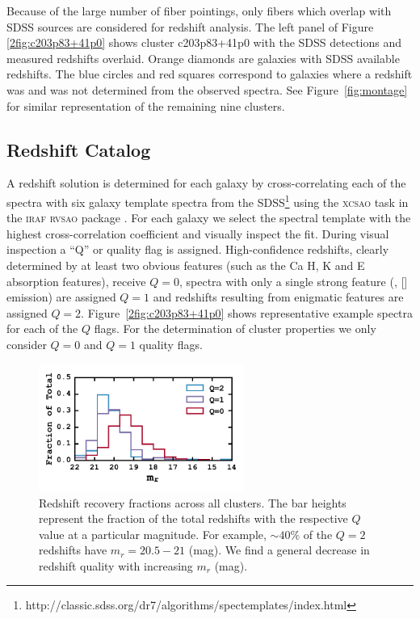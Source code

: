 Because of the large number of fiber pointings, only fibers which overlap with SDSS sources are considered for redshift analysis. The left panel of Figure \ref{2fig:c203p83+41p0} shows cluster c203p83+41p0 with the SDSS detections and measured redshifts overlaid. Orange diamonds are galaxies with SDSS available redshifts. The blue circles and red squares correspond to galaxies where a redshift was and was not determined from the observed spectra. See Figure~\ref{fig:montage} for similar representation of the remaining nine clusters.

\subsection{Redshift Catalog}\label{2sec:redshift catalog} 
A redshift solution is determined for each galaxy by cross-correlating \citep{Tonry1979} each of the spectra with six galaxy template spectra from the SDSS\footnote{http://classic.sdss.org/dr7/algorithms/spectemplates/index.html} using the \textsc{xcsao} task in the \textsc{iraf} \textsc{rvsao} package \citep{Kurtz1992, Kurtz1998}. For each galaxy we select the spectral template with the highest cross-correlation coefficient and visually inspect the fit. During visual inspection a ``Q'' or quality flag is assigned. High-confidence redshifts, clearly determined by at least two obvious features (such as the Ca H, K and E absorption features), receive $Q=0$, spectra with only a single strong feature (\eg, \hbox{[]} emission) are assigned $Q=1$ and redshifts resulting from enigmatic features are assigned $Q=2$. Figure~\ref{2fig:c203p83+41p0} shows representative example spectra for each of the $Q$ flags. For the determination of cluster properties we only consider $Q=0$ and $Q=1$ quality flags. 

\begin{figure}[t]
	\begin{center}
		\includegraphics[width=0.6\textwidth]{figures2/redshiftHist.pdf}
	\end{center}
	\caption[Redshift recovery fractions across all clusters]{Redshift recovery fractions across all clusters. The bar heights represent the fraction of the total redshifts with the respective $Q$ value at a particular magnitude. For example, $\sim 40\%$ of the $Q=2$ redshifts have $m_r = 20.5-21$ (mag). We find a general decrease in redshift quality with increasing $m_r$ (mag). } \label{2fig:redshiftHist} 
\end{figure}

